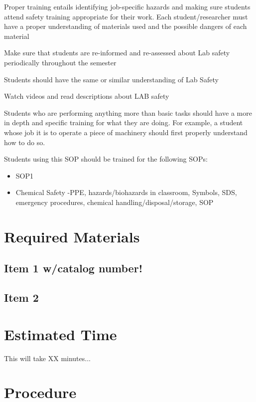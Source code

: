 \documentclass[12pt]{../SOP2}
\begin{document}
Proper training entails identifying job-specific hazards and making sure students attend safety training appropriate for their work. Each student/researcher must have a proper understanding of materials used and the possible dangers of each material



Make sure that students are re-informed and re-assessed about Lab safety periodically throughout the semester

Students should have the same or similar understanding of Lab Safety

Watch videos and read descriptions about LAB safety

Students who are performing anything more than basic tasks should have a more in depth and specific training for what they are doing. For example, a student whose job it is to operate a piece of machinery should first properly understand how to do so.

Students using this SOP should be trained for the following SOPs:

\begin{itemize}
  \item SOP1
  \item Chemical Safety
-PPE, hazards/biohazards in classroom, Symbols, SDS, emergency procedures, chemical handling/disposal/storage, SOP
\end{itemize}


\section{Required Materials}

\subsection{Item 1 w/catalog number!}
\subsection{Item 2}

\section{Estimated Time}

\NP This will take XX minutes...

\section{Procedure}
\end{document}
